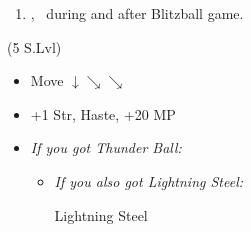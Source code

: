 \begin{enumerate}[resume]
    \item \cs[2:00], \sd\ during and after Blitzball game.
\end{enumerate}
\begin{spheregrid}
    \begin{itemize}
        \tidusf (5 S.Lvl)
        \begin{itemize}
            \item Move $\downarrow \searrow\searrow$
            \item +1 Str, Haste, +20 MP
        \end{itemize}
    \end{itemize}
\end{spheregrid}
\begin{equip}
    \begin{itemize}
        \item \textit{If you got Thunder Ball:}
        \begin{itemize}
            \wakkaf Thunder Ball
            \item \textit{If you also got Lightning Steel:}
            \begin{itemize}
                \tidusf Lightning Steel
            \end{itemize}
        \end{itemize}
    \end{itemize}
\end{equip}

